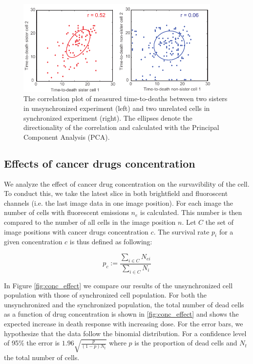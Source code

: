 \documentclass[pdftex,12pt,a4paper]{report}
\begin{document}
\begin{figure}[H]
\centering
\includegraphics[width=0.9\textwidth]{images/scd/scd.pdf}
\caption{The correlation plot of measured time-to-deaths between two sisters in unsynchronized experiment (left) and two unrelated cells in synchronized experiment (right). The ellipses denote the directionality of the correlation and calculated with the Principal Component Analysis (PCA).}
\label{fig:image_scd}
\end{figure}

\subsection{Effects of cancer drugs concentration}


We analyze the effect of cancer drug concentration on the survavibility of the cell. To conduct this, we take the latest slice in both brightfield and fluoroscent channels (i.e. the last image data in one image position). For each image the number of cells with fluorescent emissions $n_e$ is calculated. This number is then compared to the number of all cells in the image position $n$. Let $C$ the set of image positions with cancer drugs concentration $c$. The survival rate $p_i$ for a given concentration $c$ is thus defined as following:

\begin{equation}
p_{c} := \frac{\sum_{i \in C} N_{ei}}{\sum_{i \in C} N_i}
\end{equation}

In Figure \ref{fig:conc_effect} we compare our results of the unsynchronized cell population with those of synchronized cell population. For both the unsynchronized and the synchronized population, the total number of dead cells as a function of drug concentration is shown in \ref{fig:conc_effect} and shows the expected increase in death response with increasing dose. For the error bars, we hypothesize that the data follow the binomial distribution. For a confidence level of 95\% the error is $1.96 \sqrt{\frac{p}{(1 - p)N_t}}$ where $p$ is the proportion of dead cells and $N_t$ the total number of cells.
\end{document}
